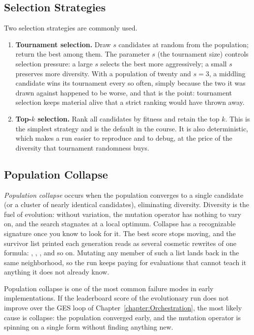 \subsection{Selection Strategies}

Two selection strategies are commonly used.

\begin{enumerate}
\item \textbf{Tournament selection.}
Draw $s$ candidates at random from the population; return the best among them.
The parameter $s$ (the tournament size) controls selection pressure: a large $s$ selects the best more aggressively; a small $s$ preserves more diversity.
With a population of twenty and $s = 3$, a middling candidate wins its tournament every so often, simply because the two it was drawn against happened to be worse, and that is the point: tournament selection keeps material alive that a strict ranking would have thrown away.

\item \textbf{Top-$k$ selection.}
Rank all candidates by fitness and retain the top $k$.
This is the simplest strategy and is the default in the course.
It is also deterministic, which makes a run easier to reproduce and to debug, at the price of the diversity that tournament randomness buys.
\end{enumerate}

\subsection{Population Collapse}

\emph{Population collapse} occurs when the population converges to a single candidate (or a cluster of nearly identical candidates), eliminating diversity.
Diversity is the fuel of evolution: without variation, the mutation operator has nothing to vary on, and the search stagnates at a local optimum.
Collapse has a recognizable signature once you know to look for it.
The best score stops moving, and the survivor list printed each generation reads as several cosmetic rewrites of one formula: , , , and so on.
Mutating any member of such a list lands back in the same neighborhood, so the run keeps paying for evaluations that cannot teach it anything it does not already know.

\begin{remark}
Population collapse is one of the most common failure modes in early implementations.
If the leaderboard score of the evolutionary run does not improve over the GES loop of Chapter~\ref{chapter:Orchestration}, the most likely cause is collapse: the population converged early, and the mutation operator is spinning on a single form without finding anything new.
\end{remark}

